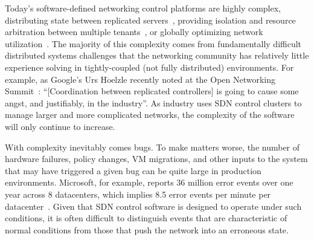 
Today's software-defined networking control platforms are highly complex,
distributing state between replicated
servers~\cite{floodlight},
providing isolation and resource arbitration between multiple
tenants~\cite{Casado:2010:VNF:1921151.1921162}, or
globally optimizing network utilization~\cite{urs_keynote}.
The majority of this complexity comes from
fundamentally difficult distributed systems challenges that the networking community has
relatively little experience
solving in tightly-coupled (not fully distributed) environments.
For example, as Google's Urs H$\ddot{\mathrm{o}}$elzle recently
noted at the Open Networking Summit~\cite{urs_keynote}: ``[Coordination between replicated controllers] is going to
cause some angst, and justifiably, in the industry''. As industry uses SDN
control clusters to manage larger and more complicated networks, the
complexity of the software will only continue to increase.

With complexity inevitably comes
bugs. To make matters worse, the number of hardware failures,
policy changes, VM migrations, and other inputs to the system that may have
triggered a given bug can be quite large in production environments. Microsoft,
for example, reports 36 million error events over one year across 8 datacenters, which
implies 8.5 error events per minute per
datacenter~\cite{Greenberg:2009:VSF:1592568.1592576}.
Given that SDN control software is designed to operate under such conditions,
it is often difficult to distinguish events that are characteristic of normal
conditions from those that push the network into an erroneous state.

